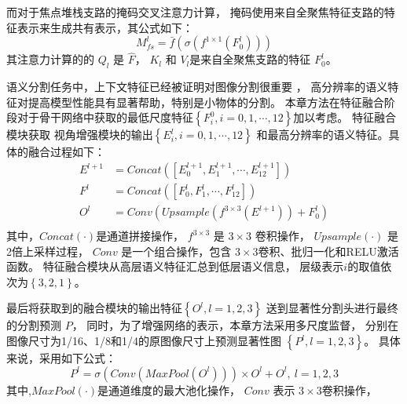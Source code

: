 而对于焦点堆栈支路的掩码交叉注意力计算，
掩码使用来自全聚焦特征支路的特征表示来生成共有表示，其公式如下：
%
%
%
%
\begin{equation}
	M_{fs}^{l} = \bar{f}   \left ( \sigma \left ( 
	f^{1\times 1}
	\left ( 
	F_{0}^{l}
	\right ) 
	\right )   \right ) 
\end{equation}
%
%
%
%
其注意力计算的的 $Q_{l}$ 是  $ \hat{F}$，
$K_{l}$ 
和
$V_{l}$是来自全聚焦支路的特征 $F_{0}^{l}$。
%
%
%
%
%
\par
%
%
%
%
语义分割任务中，上下文特征已经被证明对图像分割很重要
，
高分辨率的语义特征对提高模型性能具有显著帮助，特别是小物体的分割。
本章方法在特征融合阶段对于骨干网络中获取的最低尺度特征$\left \{ F_{i}^{0}, i = 0, 1, \cdots, 12 \right \}$加以考虑。
特征融合模块获取
视角增强模块的输出$\left \{ E_{i}^{l}, i = 0, 1, \cdots, 12 \right \}$
和最高分辨率的语义特征。具体的融合过程如下：
%
%
%
%
\begin{equation}
	\begin{aligned}
		E^{l+1} &= 
		Concat\left ( \left [ E_{0}^{l+1},E_{1}^{l+1},\cdots, E_{12}^{l+1} \right ]  \right )  
		\\  
		F^{l} &= 
		Concat\left ( \left [ F_{0}^{l},F_{1}^{l},\cdots, F_{12}^{l} \right ]  \right )  
		\\  
		{O^{l}}  &= Conv\left (  Upsample\left ( f^{3 \times 3} \left ( E^{l+1} \right )  \right ) + F_{0}^{l} \right )  \\
	\end{aligned}
\end{equation}
%
%
%
%
其中，$Concat(\cdot)$是通道拼接操作，
$f^{3 \times 3}$ 是 $3 \times 3 $ 卷积操作，
$ Upsample(\cdot) $ 是2倍上采样过程，
$ Conv $ 是一个组合操作，包含 $3\times 3$卷积、批归一化和RELU激活函数。
特征融合模块从高层语义特征汇总到低层语义信息，
层级表示$i$的取值依次为$\left \{ 3,2,1 \right \}$。
%
%
%
%
%
\par 
%
%
最后将获取到的融合模块的输出特征$\left \{ O^{l}, l = 1,2,3 \right \}$
送到显著性分割头进行最终的分割预测 $P$，
同时，为了增强网络的表示，本章方法采用多尺度监督，
分别在图像尺寸为1/16、1/8和1/4的原图像尺寸上预测显著性图
$\left \{ P^{l}, l = 1,2,3 \right \}$。
具体来说，采用如下公式：
%
%
%
%
\begin{equation}
	P^{l} = \sigma \left ( Conv\left ( MaxPool \left (  
	O^{l} \right )  \right )  \right ) 
	\times 
	O^{l} + O^{l},~ l = 1,2,3
\end{equation}
%
%
%
%
其中,$MaxPool(\cdot)$是通道维度的最大池化操作，
$ Conv $ 表示 $ 3\times 3 $卷积操作，
